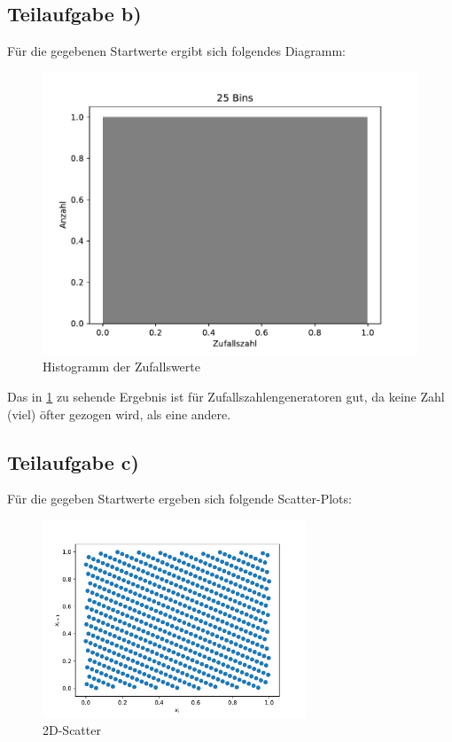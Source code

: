 \subsection{Teilaufgabe b)} \label{sec:6b}
Für die gegebenen Startwerte ergibt sich folgendes Diagramm:
\begin{figure}[H]
  \includegraphics{Aufgabe06/Teilaufgabe_b)_Histogramm.pdf}
  \caption{Histogramm der Zufallswerte}
  \label{fig:6bhist}
\end{figure}
Das in \ref{fig:6bhist} zu sehende Ergebnis ist für Zufallszahlengeneratoren gut, da keine Zahl (viel) öfter gezogen wird, als eine andere.

\subsection{Teilaufgabe c)} \label{sec:6c}
Für die gegeben Startwerte ergeben sich folgende Scatter-Plots:
\begin{figure}[H]
  \centering
  \includegraphics[width=0.7\textwidth]{Aufgabe06/Teilaufgabe_c)_2D-Scatter.pdf}
  \caption{2D-Scatter}
  \label{fig:2dscatterd}
\end{figure}

